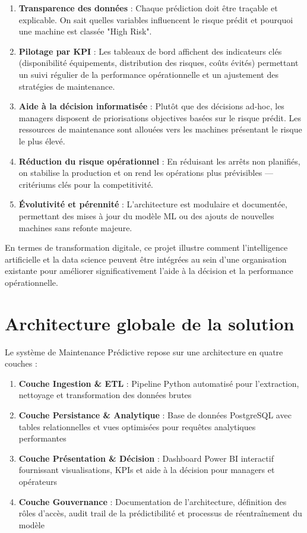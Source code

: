 \documentclass[a4paper,12pt,twoside]{report}
\begin{document}
\begin{enumerate}
    \item \textbf{Transparence des données} : Chaque prédiction doit être traçable et explicable. On sait quelles variables influencent le risque prédit et pourquoi une machine est classée "High Risk".
    
    \item \textbf{Pilotage par KPI} : Les tableaux de bord affichent des indicateurs clés (disponibilité équipements, distribution des risques, coûts évités) permettant un suivi régulier de la performance opérationnelle et un ajustement des stratégies de maintenance.
    
    \item \textbf{Aide à la décision informatisée} : Plutôt que des décisions ad-hoc, les managers disposent de priorisations objectives basées sur le risque prédit. Les ressources de maintenance sont allouées vers les machines présentant le risque le plus élevé.
    
    \item \textbf{Réduction du risque opérationnel} : En réduisant les arrêts non planifiés, on stabilise la production et on rend les opérations plus prévisibles — critériums clés pour la competitivité.
    
    \item \textbf{Évolutivité et pérennité} : L'architecture est modulaire et documentée, permettant des mises à jour du modèle ML ou des ajouts de nouvelles machines sans refonte majeure.
\end{enumerate}

En termes de transformation digitale, ce projet illustre comment l'intelligence artificielle et la data science peuvent être intégrées au sein d'une organisation existante pour améliorer significativement l'aide à la décision et la performance opérationnelle.

\section{Architecture globale de la solution}

Le système de Maintenance Prédictive repose sur une architecture en quatre couches :

\begin{enumerate}
    \item \textbf{Couche Ingestion \& ETL} : Pipeline Python automatisé pour l'extraction, nettoyage et transformation des données brutes
    \item \textbf{Couche Persistance \& Analytique} : Base de données PostgreSQL avec tables relationnelles et vues optimisées pour requêtes analytiques performantes
    \item \textbf{Couche Présentation \& Décision} : Dashboard Power BI interactif fournissant visualisations, KPIs et aide à la décision pour managers et opérateurs
    \item \textbf{Couche Gouvernance} : Documentation de l'architecture, définition des rôles d'accès, audit trail de la prédictibilité et processus de réentraînement du modèle
\end{enumerate}
\end{document}
